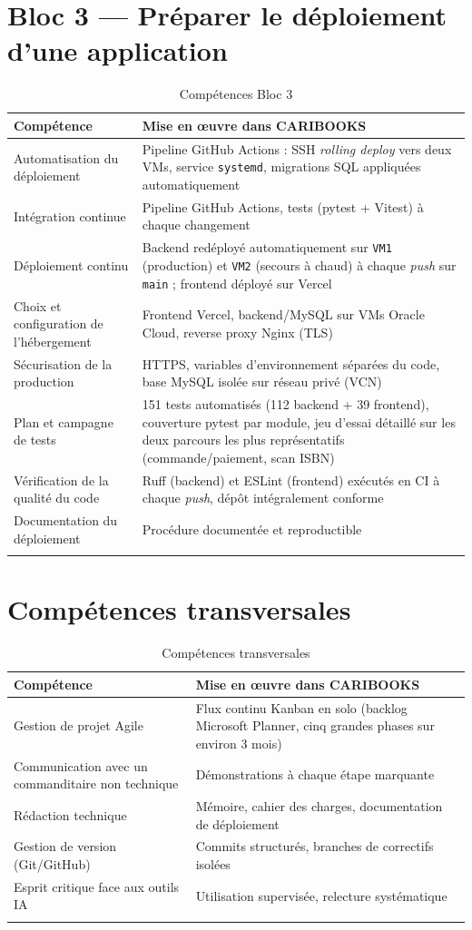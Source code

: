 \documentclass[10pt, a4paper]{article}
\begin{document}
\section{Bloc 3 — Préparer le déploiement d'une application}

\begin{longtable}{@{}L{6cm}L{9.5cm}@{}}
\toprule
\textbf{Compétence} & \textbf{Mise en œuvre dans CARIBOOKS} \\
\midrule
\endhead
Automatisation du déploiement & Pipeline GitHub Actions : SSH \textit{rolling deploy} vers deux VMs, service \texttt{systemd}, migrations SQL appliquées automatiquement \\
Intégration continue & Pipeline GitHub Actions, tests (pytest + Vitest) à chaque changement \\
Déploiement continu & Backend redéployé automatiquement sur \texttt{VM1} (production) et \texttt{VM2} (secours à chaud) à chaque \textit{push} sur \texttt{main} ; frontend déployé sur Vercel \\
Choix et configuration de l'hébergement & Frontend Vercel, backend/MySQL sur VMs Oracle Cloud, reverse proxy Nginx (TLS) \\
Sécurisation de la production & HTTPS, variables d'environnement séparées du code, base MySQL isolée sur réseau privé (VCN) \\
Plan et campagne de tests & 151 tests automatisés (112 backend + 39 frontend), couverture pytest par module, jeu d'essai détaillé sur les deux parcours les plus représentatifs (commande/paiement, scan ISBN) \\
Vérification de la qualité du code & Ruff (backend) et ESLint (frontend) exécutés en CI à chaque \textit{push}, dépôt intégralement conforme \\
Documentation du déploiement & Procédure documentée et reproductible \\
\bottomrule
\caption{Compétences Bloc 3}
\end{longtable}

\section{Compétences transversales}

\begin{longtable}{@{}L{6cm}L{9.5cm}@{}}
\toprule
\textbf{Compétence} & \textbf{Mise en œuvre dans CARIBOOKS} \\
\midrule
\endhead
Gestion de projet Agile & Flux continu Kanban en solo (backlog Microsoft Planner, cinq grandes phases sur environ 3 mois) \\
Communication avec un commanditaire non technique & Démonstrations à chaque étape marquante \\
Rédaction technique & Mémoire, cahier des charges, documentation de déploiement \\
Gestion de version (Git/GitHub) & Commits structurés, branches de correctifs isolées \\
Esprit critique face aux outils IA & Utilisation supervisée, relecture systématique \\
\bottomrule
\caption{Compétences transversales}
\end{longtable}
\end{document}
